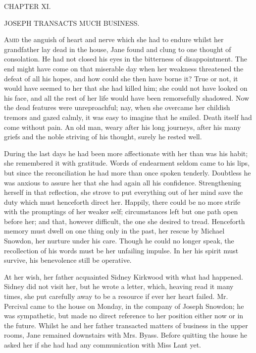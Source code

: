 {}

{CHAPTER XI.}

JOSEPH TRANSACTS MUCH BUSINESS.

\textsc{Amid} the anguish of heart and nerve which she had to endure
whilst her grandfather lay dead in the house, Jane found and clung to
one thought of consolation. He had not closed his eyes in the bitterness
of disappointment. The end might have come on that miserable day when
her weakness threatened the defeat of all his hopes, and how could she
then have borne it? True or not, it would have seemed to her that she
had killed him; she could not have looked on his face, and all the rest
of her life would have been remorsefully shadowed. Now the dead features
were unreproachful; nay, when she overcame her childish tremors and
gazed calmly, it was easy to imagine that he smiled. Death itself had
come without pain. An old man, weary after his long journeys, {}after
his many griefs and the noble striving of his thought, surely he rested
well.

During the last days he had been more affectionate with her than was his
habit; she remembered it with gratitude. Words of endearment seldom came
to his lips, but since the reconciliation he had more than once spoken
tenderly. Doubtless he was anxious to assure her that she had again all
his confidence. Strengthening herself in that reflection, she strove to
put everything out of her mind save the duty which must henceforth
direct her. Happily, there could be no more strife with the promptings
of her weaker self; circumstances left but one path open before her; and
that, however difficult, the one she desired to tread. Henceforth memory
must dwell on one thing only in the past, her rescue by Michael Snowdon,
her nurture under his care. Though he could no longer speak, the
recollection of his words must be her unfailing impulse. In her his
spirit must survive, his benevolence still be operative.

At her wish, her father acquainted Sidney Kirkwood with what had
happened. Sidney did not visit her, but he wrote a letter, which,
{}heaving read it many times, she put carefully away to be a resource if
ever her heart failed. Mr. Percival came to the house on Monday, in the
company of Joseph Snowdon; he was sympathetic, but made no direct
reference to her position either now or in the future. Whilst he and her
father transacted matters of business in the upper rooms, Jane remained
downstairs with Mrs. Byass. Before quitting the house he asked her if
she had had any communication with Miss Lant yet.

